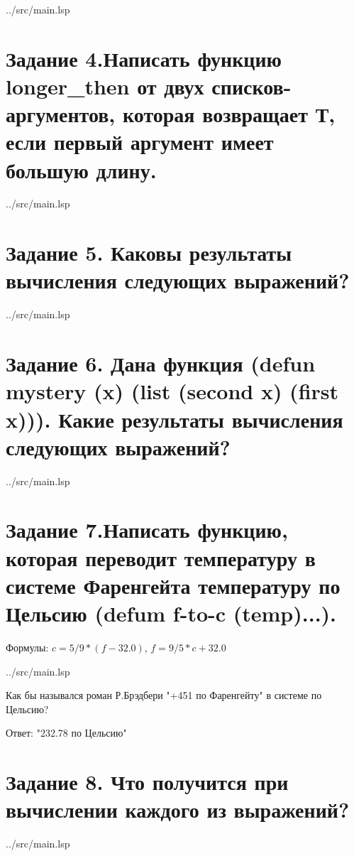 \begin{lstinputlisting}[
	caption={Задание 3},
	label={lst:t3},
	style={lsp},
	linerange={6-13},
	]{../src/main.lsp}
\end{lstinputlisting}

\section*{Задание 4.Написать функцию longer\_then от двух списков-аргументов, которая возвращает Т, если первый аргумент имеет большую длину.}

\begin{lstinputlisting}[
	caption={Задание 4},
	label={lst:t4},
	style={lsp},
	linerange={15-16},
	]{../src/main.lsp}
\end{lstinputlisting}

\section*{Задание 5. Каковы результаты вычисления следующих выражений?}
\clearpage

\begin{lstinputlisting}[
	caption={Задание 5},
	label={lst:t4},
	style={lsp},
	linerange={18-25},
	]{../src/main.lsp}
\end{lstinputlisting}

\section*{Задание 6. Дана функция (defun mystery (x) (list (second x) (first x))). Какие результаты вычисления следующих выражений?}

\begin{lstinputlisting}[
	caption={Задание 6},
	label={lst:t4},
	style={lsp},
	linerange={29-36},
	]{../src/main.lsp}
\end{lstinputlisting}

\section*{Задание 7.Написать функцию, которая переводит температуру в системе Фаренгейта температуру по Цельсию (defum f-to-c (temp)...).}
Формулы:  $c = 5 / 9 * (f - 32.0)$, $f = 9 / 5 * c + 32.0$

\begin{lstinputlisting}[
	caption={Задание 7},
	label={lst:t4},
	style={lsp},
	linerange={38-39},
	]{../src/main.lsp}
\end{lstinputlisting}
Как бы назывался роман Р.Брэдбери "+451 по Фаренгейту" в системе по Цельсию?

Ответ: "232.78 по Цельсию"

\section*{Задание 8. Что получится при вычислении каждого из выражений?}

\begin{lstinputlisting}[
	caption={Задание 7},
	label={lst:t4},
	style={lsp},
	linerange={43-49},
	]{../src/main.lsp}
\end{lstinputlisting}


